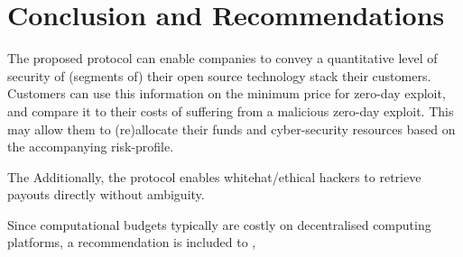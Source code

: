\section{Conclusion and Recommendations}
\label{sec:conclusion}
The proposed protocol can enable companies to convey a quantitative level of security of (segments of) their open source technology stack their customers. Customers can use this information on the minimum price for zero-day exploit, and compare it to their costs of suffering from a malicious zero-day exploit. This may allow them to (re)allocate their funds and cyber-security resources based on the accompanying risk-profile. 

The Additionally, the protocol enables whitehat/ethical hackers to retrieve payouts directly without ambiguity.

Since computational budgets typically are costly on decentralised computing platforms, a recommendation is included to ,




